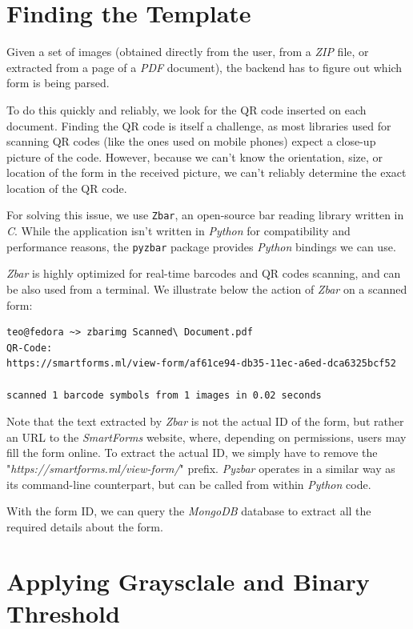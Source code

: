 \documentclass[11pt, a4paper]{report}
\def\code#1{\texttt{#1}}
\begin{document}
\section{Finding the Template}

Given a set of images (obtained directly from the user, from a \textit{ZIP} file, or extracted from a page of a \textit{PDF} document), the backend has to figure out which form is being parsed.

To do this quickly and reliably, we look for the QR code inserted on each document. Finding the QR code is itself a challenge, as most libraries used for scanning QR codes (like the ones used on mobile phones) expect a close-up picture of the code. However, because we can't know the orientation, size, or location of the form in the received picture, we can't reliably determine the exact location of the QR code.

For solving this issue, we use \code{Zbar}, an open-source bar reading library written in \textit{C}. While the application isn't written in \textit{Python} for compatibility and performance reasons, the \code{pyzbar} package provides \textit{Python} bindings we can use.

\textit{Zbar} is highly optimized for real-time barcodes and QR codes scanning, and can be also used from a terminal. We illustrate below the action of \textit{Zbar} on a scanned form:


\begin{verbatim}
teo@fedora ~> zbarimg Scanned\ Document.pdf 
QR-Code:
https://smartforms.ml/view-form/af61ce94-db35-11ec-a6ed-dca6325bcf52

scanned 1 barcode symbols from 1 images in 0.02 seconds
\end{verbatim}

Note that the text extracted by \textit{Zbar} is not the actual ID of the form, but rather an URL to the \textit{SmartForms} website, where, depending on permissions, users may fill the form online. To extract the actual ID, we simply have to remove the "\textit{https://smartforms.ml/view-form/}" prefix. \textit{Pyzbar} operates in a similar way as its command-line counterpart, but can be called from within \textit{Python} code.

With the form ID, we can query the \textit{MongoDB} database to extract all the required details about the form.

\section{Applying Graysclale and Binary Threshold}
\end{document}
